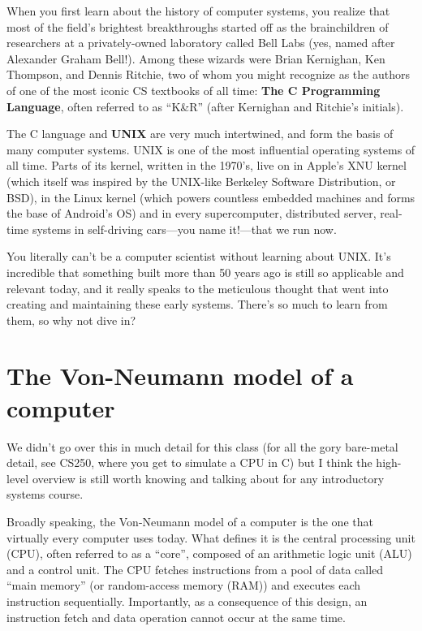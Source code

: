\documentclass[fontsize=12pt,twoside=on,openright,parskip=half]{scrbook}
\begin{document}
When you first learn about the history of computer systems, you realize that
most of the field’s brightest breakthroughs started off as the brainchildren of
researchers at a privately-owned laboratory called Bell Labs (yes, named after
Alexander Graham Bell!). Among these wizards were Brian Kernighan, Ken
Thompson, and Dennis Ritchie, two of whom you might recognize as the authors of
one of the most iconic CS textbooks of all time: \textbf{The C Programming
Language}, often referred to as “K\&R” (after Kernighan and Ritchie’s initials).

The C language and \textbf{UNIX} are very much intertwined, and form the basis
of many computer systems. UNIX is one of the most influential operating systems
of all time. Parts of its kernel, written in the 1970’s, live on in Apple’s XNU
kernel (which itself was inspired by the UNIX-like Berkeley Software
Distribution, or BSD), in the Linux kernel (which powers countless embedded
machines and forms the base of Android’s OS) and in every supercomputer,
distributed server, real-time systems in self-driving cars—you name it!—that we
run now. 

You literally can’t be a computer scientist without learning about UNIX. It’s
incredible that something built more than 50 years ago is still so applicable
and relevant today, and it really speaks to the meticulous thought that went
into creating and maintaining these early systems. There’s so much to learn
from them, so why not dive in?

\section*{The Von-Neumann model of a computer}

We didn’t go over this in much detail for this class (for all the gory
bare-metal detail, see CS250, where you get to simulate a CPU in C) but I think
the high-level overview is still worth knowing and talking about for any
introductory systems course.

Broadly speaking, the Von-Neumann model of a computer is the one that virtually
every computer uses today. What defines it is the central processing unit
(CPU), often referred to as a “core”, composed of an arithmetic logic unit
(ALU) and a control unit. The CPU fetches instructions from a pool of data
called “main memory” (or random-access memory (RAM)) and executes each
instruction sequentially. Importantly, as a consequence of this design, an
instruction fetch and data operation cannot occur at the same time.
\end{document}
